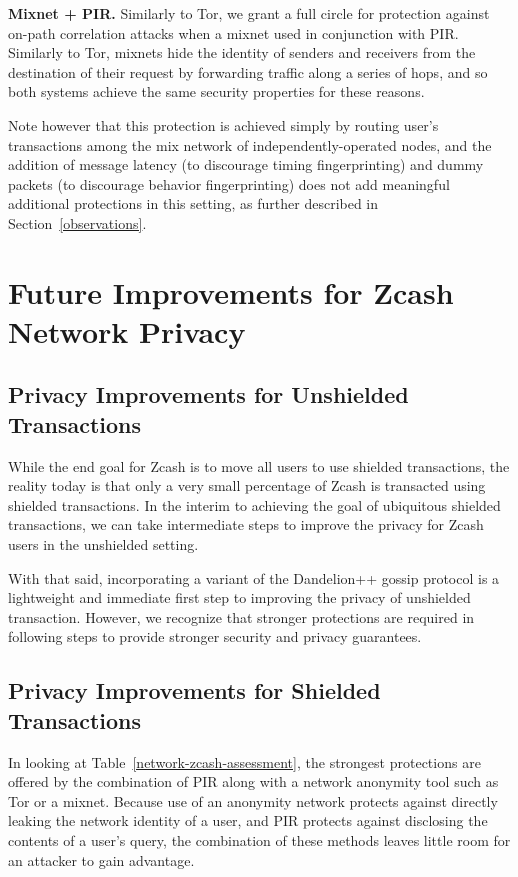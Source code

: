 \documentclass{article}
\begin{document}
\textbf{Mixnet + PIR.}
Similarly to Tor, we grant a full circle for protection against on-path
correlation attacks when a mixnet used in
conjunction with PIR. Similarly to Tor, mixnets hide the identity of senders
and receivers from the destination of their request by forwarding traffic along
a series of hops, and so both systems achieve the same security properties for
these reasons.

Note however that this protection is
achieved simply by routing user's transactions among the mix network of
independently-operated nodes, and the addition of message latency (to
discourage timing fingerprinting) and dummy packets (to discourage behavior
fingerprinting) does not add meaningful additional protections in this setting,
as further described in Section~\ref{observations}.

\section{Future Improvements for Zcash Network Privacy}
\label{future-improvements}

\subsection{Privacy Improvements for Unshielded Transactions}

While the end goal for Zcash is to move all users to use shielded transactions,
the reality today is that only a very small percentage of Zcash is transacted
using shielded transactions. In the interim to achieving the goal of
ubiquitous shielded transactions, we can take intermediate steps to improve
the privacy for Zcash users in the unshielded setting.

With that said, incorporating a variant of the Dandelion++ gossip protocol is a
lightweight and immediate first step to improving the privacy of unshielded
transaction. However, we recognize that stronger protections are required in
following steps to provide stronger security and privacy guarantees.

\subsection{Privacy Improvements for Shielded Transactions}

In looking at Table~\ref{network-zcash-assessment}, the strongest protections
are offered by the combination of PIR along with a network anonymity tool such
as Tor or a mixnet. Because use of an anonymity network protects against
directly leaking the network identity of a user, and PIR protects against
disclosing the contents of a user's query, the combination of these methods
leaves little room for an attacker to gain advantage.
\end{document}
